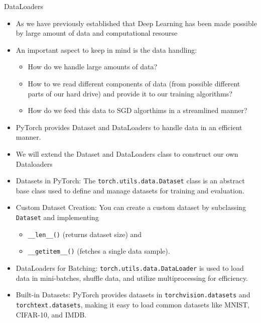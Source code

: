 \begin{frame}[allowframebreaks]{DataLoaders}
\begin{itemize}
    \item As we have previously established that Deep Learning has been made possible by large amount of data and computational resourse
    \item An important aspect to keep in mind is the data handling:
    \begin{itemize}
        \item How do we handle large amounts of data?
        \item How to we read different components of data (from possible different parts of our hard drive) and provide it to our training algorithms?
        \item How do we feed this data to SGD algorthims in a streamlined manner?
    \end{itemize}

    \item PyTorch provides Dataset and DataLoaders to handle data in an efficient manner.
    \item We will extend the Dataset and DataLoaders class to construct our own Dataloaders
\end{itemize}

\framebreak

\begin{itemize}
    \item Datasets in PyTorch: The \texttt{torch.utils.data.Dataset} class is an abstract base class used to define and manage datasets for training and evaluation.
    \item Custom Dataset Creation: You can create a custom dataset by subclassing \texttt{Dataset} and implementing 
    \begin{itemize}
        \item  \texttt{\_\_len\_\_()} (returns dataset size) and 
        \item \texttt{\_\_getitem\_\_()} (fetches a single data sample).
    \end{itemize}
    
    \item DataLoaders for Batching: \texttt{torch.utils.data.DataLoader} is used to load data in mini-batches, shuffle data, and utilize multiprocessing for efficiency.
    \item Built-in Datasets: PyTorch provides datasets in \texttt{torchvision.datasets} and \texttt{torchtext.datasets}, making it easy to load common datasets like MNIST, CIFAR-10, and IMDB.
\end{itemize}


\end{frame}
